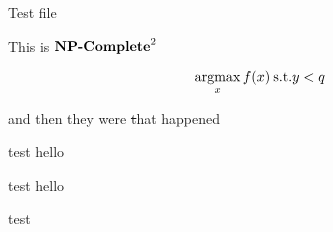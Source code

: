 \documentclass[12pt]{article}
\begin{document}
Test file

This is \({{\textbf{NP-Complete}}}^2\)


\[
  \operatorname*{argmax}_x f(x) \: \text{s.t.} y < q
\]



and then they were \st that happened


\begin{problem}
  test hello
\end{problem}


\begin{solution*}[annotate]
  test hello
\end{solution*}

\begin{thm}
  test
\end{thm}
\end{document}
